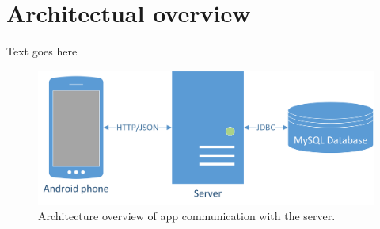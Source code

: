 \section{Architectual overview}
Text goes here

\begin{figure}[H]
\includegraphics[width=\textwidth]{ch/architecture/fig/arch.png}
\caption{Architecture overview of app communication with the server.}
\label{fig:architecture}
\end{figure}


